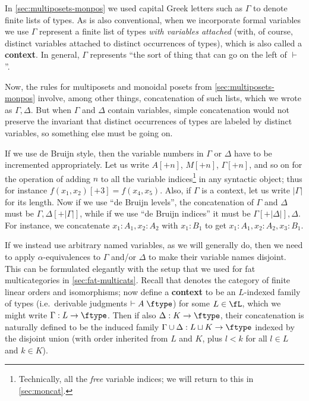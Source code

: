 \documentclass{book}
\let\types\vdash
\def\type{\;\ftype}
\begin{document}
In \cref{sec:multiposets-monpos} we used capital Greek letters such as $\Gamma$ to denote finite lists of types.
As is also conventional, when we incorporate formal variables we use $\Gamma$ represent a finite list of types \emph{with variables attached} (with, of course, distinct variables attached to distinct occurrences of types), which is also called a \textbf{context}.
In general, $\Gamma$ represents ``the sort of thing that can go on the left of $\types$''.

Now, the rules for multiposets and monoidal posets from \cref{sec:multiposets-monpos} involve, among other things, concatenation of such lists, which we wrote as $\Gamma,\Delta$.
But when $\Gamma$ and $\Delta$ contain variables, simple concatenation would not preserve the invariant that distinct occurrences of types are labeled by distinct variables, so something else must be going on.

If we use de Bruijn style, then the variable numbers in $\Gamma$ or $\Delta$ have to be incremented appropriately.
Let us write $A[+n]$, $M[+n]$, $\Gamma[+n]$, and so on for the operation of adding $n$ to all the variable indices\footnote{Technically, all the \emph{free} variable indices; we will return to this in \cref{sec:moncat}.} in any syntactic object; thus for instance $f(x_1,x_2)[+3] = f(x_4,x_5)$.
Also, if $\Gamma$ is a context, let us write $|\Gamma|$ for its length.
Now if we use ``de Bruijn levels'', the concatenation of $\Gamma$ and $\Delta$ must be $\Gamma,\Delta[+|\Gamma|]$, while if we use ``de Bruijn indices'' it must be $\Gamma[+|\Delta|],\Delta$.
For instance, we concatenate $x_1:A_1, x_2:A_2$ with $x_1:B_1$ to get $x_1:A_1, x_2:A_2,x_3:B_1$.

If we instead use arbitrary named variables, as we will generally do, then we need to apply $\alpha$-equivalences to $\Gamma$ and/or $\Delta$ to make their variable names disjoint.
This can be formulated elegantly with the setup that we used for fat multicategories in \cref{sec:fat-multicats}.
Recall that \fL denotes the category of finite linear orders and isomorphisms; now define a \textbf{context} to be an $L$-indexed family of types (i.e.\ derivable judgments $\types A\type$) for some $L\in\fL$, which we might write $\Gamma:L\to \ftype$.
Then if also $\Delta:K\to\ftype$, their concatenation is naturally defined to be the induced family $\Gamma\cup\Delta:L\sqcup K\to\ftype$ indexed by the disjoint union (with order inherited from $L$ and $K$, plus $l<k$ for all $l\in L$ and $k\in K$).
\end{document}
